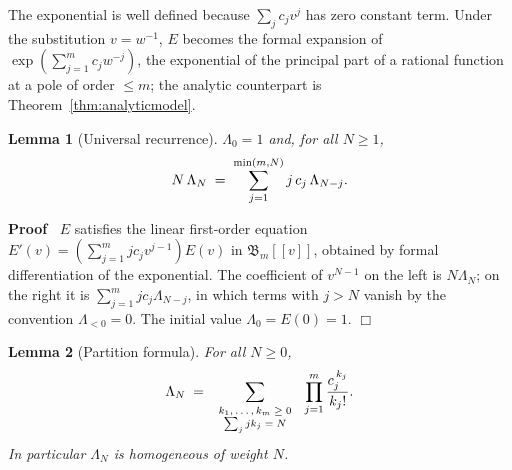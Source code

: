 \documentclass{article}
\newcommand{\tmscript}[1]{\text{\scriptsize{$#1$}}}
\newenvironment{proof}{\noindent\textbf{Proof\ }}{\hspace*{\fill}$\Box$\medskip}
\newtheorem{lemma}{Lemma}
{\theorembodyfont{\rmfamily\small}\newtheorem{problem}{Problem}}
\newcommand{\CA}{\mathfrak{B}}
\begin{document}
The exponential is well defined because $\sum_j c_j v^j$ has zero constant
term. Under the substitution $v = w^{- 1}$, $E$ becomes the formal expansion
of $\exp \left( \sum_{j = 1}^m c_j w^{- j} \right)$, the exponential of the
principal part of a rational function at a pole of order $\le m$; the analytic
counterpart is Theorem~\ref{thm:analyticmodel}.

\begin{lemma}
  [Universal recurrence]\label{lem:recurrence} $\Lambda_0 = 1$ and, for all $N
  \ge 1$,
  \begin{equation}
    \label{eq:universal} N \hspace{0.17em} \Lambda_N \hspace{0.27em} =
    \hspace{0.27em} \sum_{j = 1}^{\min (m, N)} j \hspace{0.17em} c_j 
    \hspace{0.17em} \Lambda_{N - j} .
  \end{equation}
\end{lemma}

\begin{proof}
  $E$ satisfies the linear first-order equation $E' (v) = \left( \sum_{j =
  1}^m jc_j v^{j - 1} \right) E (v)$ in $\CA_m [[v]]$, obtained by formal
  differentiation of the exponential. The coefficient of $v^{N - 1}$ on the
  left is $N \Lambda_N$; on the right it is $\sum_{j = 1}^m jc_j \Lambda_{N -
  j}$, in which terms with $j > N$ vanish by the convention $\Lambda_{< 0} =
  0$. The initial value $\Lambda_0 = E (0) = 1$.
\end{proof}

\begin{lemma}
  [Partition formula]\label{lem:partition} For all $N \ge 0$,
  \begin{equation}
    \label{eq:partition} \Lambda_N \hspace{0.27em} = \hspace{0.27em}
    \sum_{\tmscript{\begin{array}{c}
      k_1, \ldots, k_m \ge 0\\
      \sum_j jk_j = N
    \end{array}}} \hspace{0.27em} \prod_{j = 1}^m \frac{c_j^{\hspace{0.17em}
    k_j}}{k_j !} .
  \end{equation}
  In particular $\Lambda_N$ is homogeneous of weight $N$.
\end{lemma}
\end{document}

